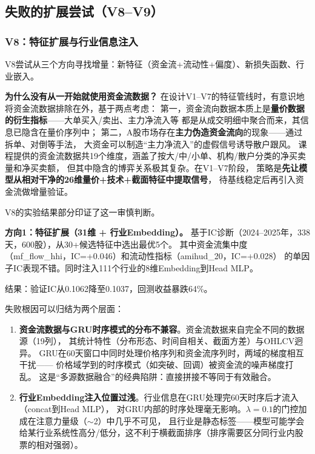 \documentclass[12pt,a4paper]{ctexart}
\begin{document}
\subsection{失败的扩展尝试（V8--V9）}

\subsubsection{V8：特征扩展与行业信息注入}

V8尝试从三个方向寻找增量：新特征（资金流+流动性+偏度）、新损失函数、行业嵌入。

\textbf{为什么没有从一开始就使用资金流数据？}
在设计V1--V7的特征管线时，有意识地将资金流数据排除在外，基于两点考虑：
第一，资金流向数据本质上是\textbf{量价数据的衍生指标}——大单买入/卖出、主力净流入等
都是从成交明细中聚合而来，其信息已隐含在量价序列中；
第二，A股市场存在\textbf{主力伪造资金流向}的现象——通过拆单、对倒等手法，
大资金可以制造“主力净流入”的虚假信号诱导散户跟风。
课程提供的资金流数据共19个维度，涵盖了按大/中/小单、机构/散户分类的净买卖量和净买卖额，
但其中隐含的博弈关系极其复杂。在V1--V7阶段，
策略是\textbf{先让模型从相对干净的26维量价+技术+截面特征中提取信号}，
待基线稳定后再引入资金流做增量验证。

V8的实验结果部分印证了这一审慎判断。

\textbf{方向1：特征扩展（31维 + 行业Embedding）。}
基于IC诊断（2024--2025年，338天，600股），从30+候选特征中选出最优5个。
其中资金流集中度（mf\_flow\_hhi，IC=+0.046）和流动性指标（amihud\_20，IC=+0.028）
的单因子IC表现不错。同时注入111个行业的8维Embedding到Head MLP。

结果：验证IC从0.1062降至0.1037，回测收益暴跌64\%。

失败根因可以归结为两个层面：
\begin{enumerate}[leftmargin=*]
    \item \textbf{资金流数据与GRU时序模式的分布不兼容}。资金流数据来自完全不同的数据源（19列），
          其统计特性（分布形态、时间自相关、截面方差）与OHLCV迥异。
          GRU在60天窗口中同时处理价格序列和资金流序列时，两域的梯度相互干扰——
          价格域学到的时序模式（如突破、回调）被资金流的噪声梯度打乱。
          这是“多源数据融合”的经典陷阱：直接拼接不等同于有效融合。
    \item \textbf{行业Embedding注入位置过浅}。行业信息在GRU处理完60天时序后才流入（concat到Head MLP），
          对GRU内部的时序处理毫无影响。$\lambda{=}0.1$的门控加成在注意力量级（$\sim$2）中几乎不可见，
          且行业是静态标签——模型可能学会给某行业系统性高分/低分，这不利于横截面排序（排序需要区分同行业内股票的相对强弱）。
\end{enumerate}
\end{document}
